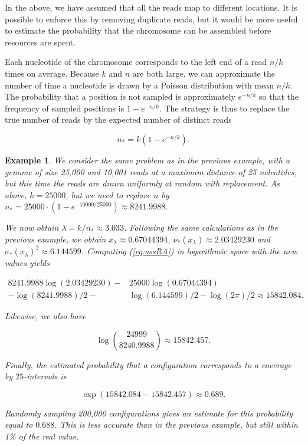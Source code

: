 \documentclass{article}
\newtheorem{example}{Example}
\begin{document}
In the above, we have assumed that all the reads map to different
locations. It is possible to enforce this by removing duplicate reads, but
it would be more useful to estimate the probability that the chromosome
can be assembled before resources are spent. 

Each nucleotide of the chromosome corresponds to the left end of a read
$n/k$ times on average. Because $k$ and $n$ are both large, we can
approximate the number of time a nucleotide is drawn by a Poisson
distribution with mean $n/k$. The probability that a position is not
sampled is approximately $e^{-n/k}$ so that the frequency of sampled
positions is $1-e^{-n/k}$. The strategy is thus to replace the true number
of reads by the expected number of distinct reads

\begin{equation}
\label{eq:nstar}
n_* = k(1-e^{-n/k}).
\end{equation}


\begin{example}
We consider the same problem as in the previous example, with a genome of
size 25,000 and 10,001 reads at a maximum distance of 25 ncleotides, but
this time the reads are drawn uniformly at random with replacement. As
above, $k=25000$, but we need to replace $n$ by $n_* = 25000 \cdot
(1-e^{-10000/25000}) \approx 8241.9988$.

We now obtain $\lambda = k/n_* \approx 3.033$. Following the same
calculations as in the previous example, we obtain $x_\lambda \approx
0.67044394$, $\nu_*(x_\lambda) \approx 2.03429230$ and
$\sigma_*(x_\lambda)^2 \approx 6.144599$. Computing (\ref{eq:assRA}) in
logarithmic space with the new values yields

\begin{equation*}
\begin{split}
8241.9988\log(2.03429230) - &25000\log(0.67044394) \\
- \log(8241.9988)/2 - &\log(6.144599)/2 - \log(2\pi)/2
\approx 15842.084.
\end{split}
\end{equation*}

Likewise, we also have

\begin{equation*}
\log { 24999 \choose 8240.9988 } \approx 15842.457.
\end{equation*}

Finally, the estimated probability that a configuration corresponds to a
coverage by $25$-intervals is

\begin{equation*}
\exp(15842.084-15842.457) \approx 0.689.
\end{equation*}

Randomly sampling 200,000 configurations gives an estimate for this
probability equal to $0.688$. This is less accurate than in the previous
example, but still within 1\% of the real value.
\end{example}
\end{document}

